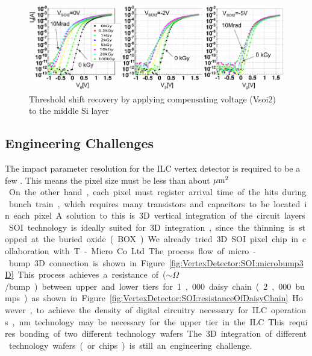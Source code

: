 \begin{figure}
\centering
\includegraphics[width=\textwidth]{VertexDetector/SOI/thresholdShift}
\caption{Threshold shift recovery by applying compensating voltage (Vsoi2) to the middle Si layer}
\label{fig:VertexDetector:SOI:thresholdShift}
\end{figure}

\subsection{Engineering Challenges}
The impact parameter resolution for the ILC vertex detector is required to be a few \micron. This means the pixel size must be less than about \unit[20]{$\mu\mathrm{m}^2$}. On the other hand, each pixel must register arrival time of the hits during bunch train, which requires many transistors and capacitors to be located in each pixel.
A solution to this is 3D vertical integration of the circuit layers. SOI technology is ideally suited for 3D integration, since the thinning is stopped at the buried oxide (BOX). We already tried 3D SOI pixel chip in collaboration with T-Micro Co. Ltd. The process flow of micro-bump 3D connection is shown in Figure~\ref{fig:VertexDetector:SOI:microbump3D}. This process achieves a resistance of ($\sim$\unit[6]{$\Omega$}/bump) between upper and lower tiers for 1,000 daisy chain (2,000 bumps) as shown in Figure~\ref{fig:VertexDetector:SOI:resistanceOfDaisyChain}.
However, to achieve the density of digital circuitry necessary for ILC operations, \unit[32]{nm} technology may be necessary for the upper tier in the ILC. This requires bonding of two different technology wafers. The 3D integration of different technology wafers (or chips) is still an engineering challenge.

